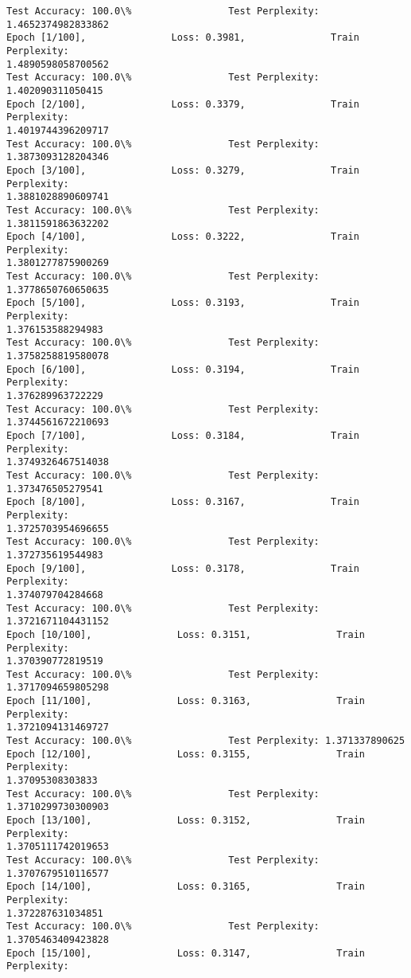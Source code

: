 \documentclass[11pt]{article}
\begin{document}
    \begin{Verbatim}[commandchars=\\\{\}]
Test Accuracy: 100.0\%                 Test Perplexity: 1.4652374982833862
Epoch [1/100],               Loss: 0.3981,               Train Perplexity:
1.4890598058700562
Test Accuracy: 100.0\%                 Test Perplexity: 1.402090311050415
Epoch [2/100],               Loss: 0.3379,               Train Perplexity:
1.4019744396209717
Test Accuracy: 100.0\%                 Test Perplexity: 1.3873093128204346
Epoch [3/100],               Loss: 0.3279,               Train Perplexity:
1.3881028890609741
Test Accuracy: 100.0\%                 Test Perplexity: 1.3811591863632202
Epoch [4/100],               Loss: 0.3222,               Train Perplexity:
1.3801277875900269
Test Accuracy: 100.0\%                 Test Perplexity: 1.3778650760650635
Epoch [5/100],               Loss: 0.3193,               Train Perplexity:
1.376153588294983
Test Accuracy: 100.0\%                 Test Perplexity: 1.3758258819580078
Epoch [6/100],               Loss: 0.3194,               Train Perplexity:
1.376289963722229
Test Accuracy: 100.0\%                 Test Perplexity: 1.3744561672210693
Epoch [7/100],               Loss: 0.3184,               Train Perplexity:
1.3749326467514038
Test Accuracy: 100.0\%                 Test Perplexity: 1.373476505279541
Epoch [8/100],               Loss: 0.3167,               Train Perplexity:
1.3725703954696655
Test Accuracy: 100.0\%                 Test Perplexity: 1.372735619544983
Epoch [9/100],               Loss: 0.3178,               Train Perplexity:
1.374079704284668
Test Accuracy: 100.0\%                 Test Perplexity: 1.3721671104431152
Epoch [10/100],               Loss: 0.3151,               Train Perplexity:
1.370390772819519
Test Accuracy: 100.0\%                 Test Perplexity: 1.3717094659805298
Epoch [11/100],               Loss: 0.3163,               Train Perplexity:
1.3721094131469727
Test Accuracy: 100.0\%                 Test Perplexity: 1.371337890625
Epoch [12/100],               Loss: 0.3155,               Train Perplexity:
1.37095308303833
Test Accuracy: 100.0\%                 Test Perplexity: 1.3710299730300903
Epoch [13/100],               Loss: 0.3152,               Train Perplexity:
1.3705111742019653
Test Accuracy: 100.0\%                 Test Perplexity: 1.3707679510116577
Epoch [14/100],               Loss: 0.3165,               Train Perplexity:
1.372287631034851
Test Accuracy: 100.0\%                 Test Perplexity: 1.3705463409423828
Epoch [15/100],               Loss: 0.3147,               Train Perplexity:

\end{Verbatim}
\end{document}
